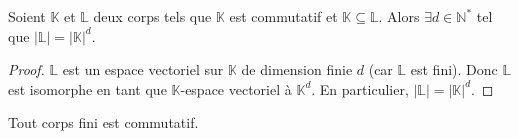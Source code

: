 






	\begin{lemma}
		\label{theoreme-de-wedderburn-1}
		Soient $\mathbb{K}$ et $\mathbb{L}$ deux corps tels que $\mathbb{K}$ est commutatif et $\mathbb{K} \subseteq \mathbb{L}$. Alors $\exists d \in \mathbb{N}^*$ tel que $|\mathbb{L}| = |\mathbb{K}|^d$.
	\end{lemma}

	\begin{proof}
		$\mathbb{L}$ est un espace vectoriel sur $\mathbb{K}$ de dimension finie $d$ (car $\mathbb{L}$ est fini). Donc $\mathbb{L}$ est isomorphe en tant que $\mathbb{K}$-espace vectoriel à $\mathbb{K}^d$. En particulier, $|\mathbb{L}| = |\mathbb{K}|^d$.
	\end{proof}

	\begin{theorem}[Wedderburn]
		Tout corps fini est commutatif.
	\end{theorem}

